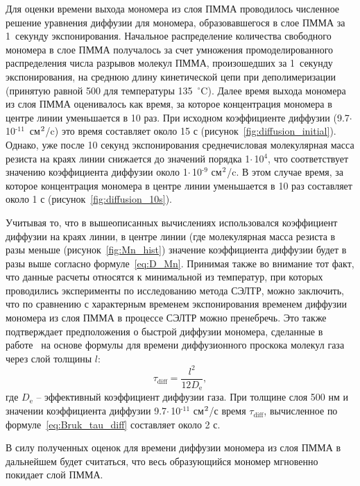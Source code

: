 Для оценки времени выхода мономера из слоя ПММА проводилось численное решение уравнения диффузии для мономера, образовавшегося в слое ПММА за 1~секунду экспонирования. Начальное распределение количества свободного мономера в слое ПММА получалось за счет умножения промоделированного распределения числа разрывов молекул ПММА, произошедших за 1~секунду экспонирования, на среднюю длину кинетической цепи при деполимеризации (принятую равной 500 для температуры 135~$^\circ$C). Далее время выхода мономера из слоя ПММА оценивалось как время, за которое концентрация мономера в центре линии уменьшается в 10 раз.
При исходном коэффициенте диффузии (9.7\:$\cdot$\,10$^\text{-11}$~см$^\text{2}$/c) это время составляет около 15 с (рисунок~\ref{fig:diffusion_initial}). Однако, уже после 10 секунд экспонирования среднечисловая молекулярная масса резиста на краях линии снижается до значений порядка 1\:$\cdot$\,10$^\text{4}$, что соответствует значению коэффициента диффузии около 1\:$\cdot$\,10$^\text{-9}$ см$^\text{2}$/c. В этом случае время, за которое концентрация мономера в центре линии уменьшается в 10 раз составляет около 1 с (рисунок~\ref{fig:diffusion_10s}).

Учитывая то, что в вышеописанных вычислениях использовался коэффициент диффузии на краях линии, в центре линии (где молекулярная масса резиста в разы меньше (рисунок~\ref{fig:Mn_hist}) значение коэффициента диффузии будет в разы выше согласно формуле~\ref{eq:D_Mn}. Принимая также во внимание тот факт, что данные расчеты относятся к минимальной из температур, при которых проводились эксперименты по исследованию метода СЭЛТР, можно заключить, что по сравнению с характерным временем экспонирования временем диффузии мономера из слоя ПММА в процессе СЭЛТР можно пренебречь. Это также подтверждает предположения о быстрой диффузии мономера, сделанные в работе~\cite{Bruk_2013} на основе формулы для времени диффузионного проскока молекул газа через слой толщины $l$:
\begin{equation} \label{eq:Bruk_tau_diff}
	\tau_{\text{diff}} = \frac{l^2}{12 D_\mathrm{e}},
\end{equation}
где $D_\mathrm{e}$ -- эффективный коэффициент диффузии газа. При толщине слоя 500 нм и значении коэффициента диффузии 9.7\:$\cdot$\,10$^\text{-11}$ см$^\text{2}$/с время $\tau_{\text{diff}}$, вычисленное по формуле~\ref{eq:Bruk_tau_diff} составляет около 2 с.

В силу полученных оценок для времени диффузии мономера из слоя \linebreak ПММА в дальнейшем будет считаться, что весь образующийся мономер мгновенно покидает слой ПММА.

